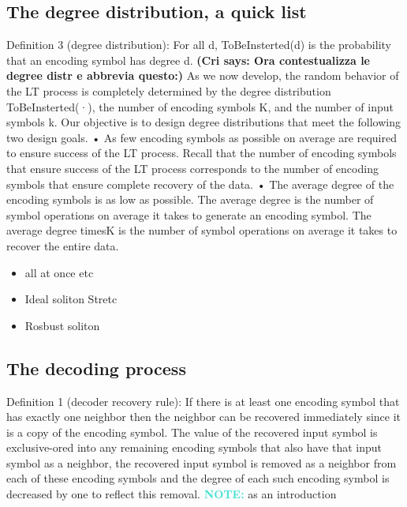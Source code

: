\documentclass[12pt,a4paper,titlepage,twocolumn]{article}
\newcommand{\cri}[1]{\textcolor{MyColor2}{\textbf{(Cri says: #1)}}}
\newcommand{\note}{\textcolor{Turquoise}{\textbf{NOTE: }}}
\begin{document}
\subsection{The degree distribution, a quick list}
Definition 3 (degree distribution): For all d, ToBeInsterted(d) is the
probability that an encoding symbol has degree d. \cri{Ora contestualizza le degree distr e abbrevia questo:}
As we now develop, the random behavior of the LT process
is completely determined by the degree distribution
ToBeInsterted(·), the number of encoding symbols K, and the number
of input symbols k. Our objective is to design degree distributions
that meet the following two design goals.
• As few encoding symbols as possible on average are
required to ensure success of the LT process. Recall
that the number of encoding symbols that ensure success
of the LT process corresponds to the number of
encoding symbols that ensure complete recovery of the
data.
• The average degree of the encoding symbols is as low
as possible. The average degree is the number of symbol
operations on average it takes to generate an encoding
symbol. The average degree timesK is the number
of symbol operations on average it takes to recover the
entire data.
\begin{itemize}
  \item all at once etc
  \item Ideal soliton Stretc
  \item Rosbust soliton
\end{itemize}
\subsection{The decoding process}
Definition 1 (decoder recovery rule): If there is at least
one encoding symbol that has exactly one neighbor then the
neighbor can be recovered immediately since it is a copy of
the encoding symbol. The value of the recovered input symbol
is exclusive-ored into any remaining encoding symbols
that also have that input symbol as a neighbor, the recovered
input symbol is removed as a neighbor from each of
these encoding symbols and the degree of each such encoding
symbol is decreased by one to reflect this removal. \note{as an introduction}
\end{document}
